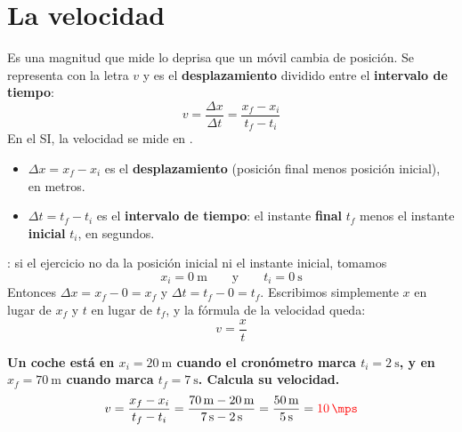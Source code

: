 \section{La velocidad}

\begin{definition}[Velocidad]
    Es una magnitud que mide lo deprisa que un móvil cambia de posición. Se representa con la letra \(v\) y es el \textbf{desplazamiento} dividido entre el \textbf{intervalo de tiempo}:
    \begin{equation*}
        v = \dfrac{\Delta x}{\Delta t} = \dfrac{x_f - x_i}{t_f - t_i}
    \end{equation*}
    En el SI, la velocidad se mide en \unit{\mps}.
\end{definition}

\begin{itemize}
    \item \(\Delta x = x_f - x_i\) es el \textbf{desplazamiento} (posición final menos posición inicial), en metros.
    \item \(\Delta t = t_f - t_i\) es el \textbf{intervalo de tiempo}: el instante \textbf{final} \(t_f\) menos el instante \textbf{inicial} \(t_i\), en segundos.
\end{itemize}

\begin{impt}
    : si el ejercicio no da la posición inicial ni el instante inicial, tomamos
    \begin{equation*}
        x_i = \qty{0}{\m} \qquad\text{y}\qquad t_i = \qty{0}{\s}
    \end{equation*}
    Entonces \(\Delta x = x_f - 0 = x_f\) y \(\Delta t = t_f - 0 = t_f\). Escribimos simplemente \(x\) en lugar de \(x_f\) y \(t\) en lugar de \(t_f\), y la fórmula de la velocidad queda:
    \begin{equation*}
        v = \dfrac{x}{t}
    \end{equation*}
\end{impt}

\begin{example}
    \textbf{Un coche está en \(x_i = \qty{20}{\m}\) cuando el cronómetro marca \(t_i = \qty{2}{\s}\), y en \(x_f = \qty{70}{\m}\) cuando marca \(t_f = \qty{7}{\s}\). Calcula su velocidad.}
    \begin{equation*}
        v = \dfrac{x_f - x_i}{t_f - t_i} = \dfrac{\qty{70}{\m} - \qty{20}{\m}}{\qty{7}{\s} - \qty{2}{\s}} = \dfrac{\qty{50}{\m}}{\qty{5}{\s}} = \textcolor{red}{\qty{10}{\mps}}
    \end{equation*}
\end{example}

